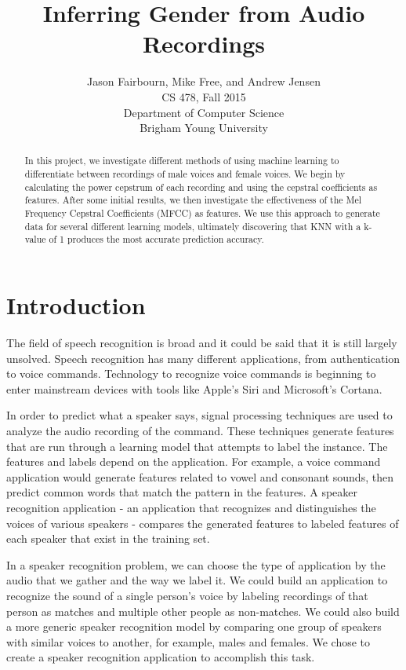 \documentclass{article}
\title{Inferring Gender from Audio Recordings}
\author{Jason Fairbourn, Mike Free, and Andrew Jensen \\
CS 478, Fall 2015\\
Department of Computer Science\\
Brigham Young University}
\begin{document}
\maketitle

\begin{abstract}
In this project, we investigate different methods of using machine learning to differentiate between recordings of male voices and female voices.  We begin by calculating the power cepstrum of each recording and using the cepstral coefficients as features.  After some initial results, we then investigate the effectiveness of the Mel Frequency Cepstral Coefficients (MFCC) as features.  We use this approach to generate data for several different learning models, ultimately discovering that KNN with a k-value of 1 produces the most accurate prediction accuracy.
\end{abstract}

\section{Introduction}

The field of speech recognition is broad and it could be said that it is still largely unsolved. Speech recognition has many different applications, from authentication to voice commands. Technology to recognize voice commands is beginning to enter mainstream devices with tools like Apple's Siri and Microsoft's Cortana.

In order to predict what a speaker says, signal processing techniques are used to analyze the audio recording of the command. These techniques generate features that are run through a learning model that attempts to label the instance. The features and labels depend on the application. For example, a voice command application would generate features related to vowel and consonant sounds, then predict common words that match the pattern in the features. A speaker recognition application - an application that recognizes and distinguishes the voices of various speakers - compares the generated features to labeled features of each speaker that exist in the training set.

In a speaker recognition problem, we can choose the type of application by the audio that we gather and the way we label it. We could build an application to recognize the sound of a single person’s voice by labeling recordings of that person as matches and multiple other people as non-matches. We could also build a more generic speaker recognition model by comparing one group of speakers with similar voices to another, for example, males and females. We chose to create a speaker recognition application to accomplish this task.
\end{document}
